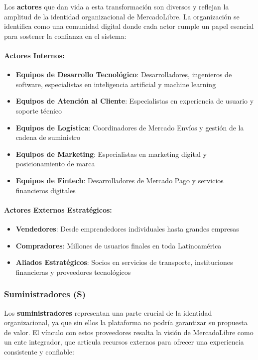 Los \textbf{actores} que dan vida a esta transformación son diversos y reflejan la amplitud de la identidad organizacional de MercadoLibre. La organización se identifica como una comunidad digital donde cada actor cumple un papel esencial para sostener la confianza en el sistema:

\paragraph{Actores Internos:}
\begin{itemize}
\item \textbf{Equipos de Desarrollo Tecnológico}: Desarrolladores, ingenieros de software, especialistas en inteligencia artificial y machine learning
\item \textbf{Equipos de Atención al Cliente}: Especialistas en experiencia de usuario y soporte técnico
\item \textbf{Equipos de Logística}: Coordinadores de Mercado Envíos y gestión de la cadena de suministro
\item \textbf{Equipos de Marketing}: Especialistas en marketing digital y posicionamiento de marca
\item \textbf{Equipos de Fintech}: Desarrolladores de Mercado Pago y servicios financieros digitales
\end{itemize}

\paragraph{Actores Externos Estratégicos:}
\begin{itemize}
\item \textbf{Vendedores}: Desde emprendedores individuales hasta grandes empresas
\item \textbf{Compradores}: Millones de usuarios finales en toda Latinoamérica
\item \textbf{Aliados Estratégicos}: Socios en servicios de transporte, instituciones financieras y proveedores tecnológicos
\end{itemize}

\subsubsection{Suministradores (S)}

Los \textbf{suministradores} representan una parte crucial de la identidad organizacional, ya que sin ellos la plataforma no podría garantizar su propuesta de valor. El vínculo con estos proveedores resalta la visión de MercadoLibre como un ente integrador, que articula recursos externos para ofrecer una experiencia consistente y confiable:

